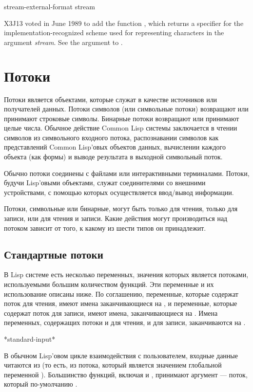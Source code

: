 \begin{defun}[Function]
stream-external-format stream

X3J13 voted in June 1989  to add the
function , which returns a
specifier for the implementation-recognized scheme used for
representing characters in the argument \emph{stream}.
See the  argument to .
\end{defun}

\else

\chapter{Потоки}
\label{STREAM}

Потоки является объектами, которые служат в качестве источников или получателей
данных.
Потоки символов (или символьные потоки) возвращают или принимают строковые
символы.
Бинарные потоки возвращают или принимают целые числа.
Обычное действие Common Lisp системы заключается в чтении символов из
символьного входного потока, распознавании символов как представлений Common
Lisp'овых объектов данных, вычислении каждого объекта (как формы) и выводе
результата в выходной символьный поток.

Обычно потоки соединены с файлами или интерактивными терминалами. 
Потоки, будучи Lisp'овыми объектами, служат соединителями со внешними
устройствами, с помощью которых осуществляется ввод/вывод информации.

Потоки, символьные или бинарные, могут быть только для чтения, только для
записи, или для чтения и записи.
Какие действия могут производиться над потоком зависит от того, к какому из шести
типов он принадлежит.

\section{Стандартные потоки}

В Lisp системе есть несколько переменных, значения которых является потоками,
используемыми большим количеством функций. Эти переменные и их использование
описаны ниже. По соглашению, переменные, которые содержат поток для чтения,
имеют имена заканчивающиеся на , и переменные, которые содержат поток
для записи, имеют имена, заканчивающиеся на .
Имена переменных, содержащих потоки и для чтения, и для записи, заканчиваются на
.

\begin{defun}[Переменная]
*standard-input*

В обычном Lisp'овом цикле взаимодействия с пользователем, входные данные
читаются из  (то есть, из потока, который является
значением глобальной переменной ). Большинство функций,
включая  и , принимают аргумент --- поток, который
по-умолчанию . 
\end{defun}

